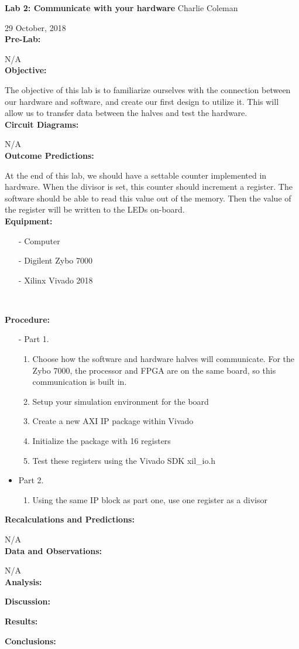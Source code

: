 \documentclass[12pt]{article}
\begin{document}
\noindent \textbf{Lab 2: Communicate with your hardware} \hfill Charlie Coleman

\noindent \hfill 29 October, 2018\\

\noindent \textbf{Pre-Lab:}

N/A\\

\noindent \textbf{Objective:}

The objective of this lab is to familiarize ourselves with the connection between our hardware and software, and create our first design to utilize it. This will allow us to transfer data between the halves and test the hardware.\\

\noindent \textbf{Circuit Diagrams:}

N/A\\

\noindent \textbf{Outcome Predictions:}

At the end of this lab, we should have a settable counter implemented in hardware. When the divisor is set, this counter should increment a register. The software should be able to read this value out of the memory. Then the value of the register will be written to the LEDs on-board.\\

\noindent \textbf{Equipment:}

\begin{itemize}[nolistsep, noitemsep]
	\item[-] Computer
	\item[-] Digilent Zybo 7000
	\item[-] Xilinx Vivado 2018
\end{itemize}~

\noindent \textbf{Procedure:}

\begin{itemize}
	\item[-] Part 1.
	\begin{enumerate}
		\item Choose how the software and hardware halves will communicate. For the Zybo 7000, the processor and FPGA are on the same board, so this communication is built in.
		\item Setup your simulation environment for the board
		\item Create a new AXI IP package within Vivado
		\item Initialize the package with 16 registers
		\item Test these registers using the Vivado SDK \8 xil\_io.h
	\end{enumerate}
	\item Part 2.
	\begin{enumerate}
		\item Using the same IP block as part one, use one register as a divisor
	\end{enumerate}
\end{itemize}

\noindent \textbf{Recalculations and Predictions:}

N/A\\

\noindent \textbf{Data and Observations:}

N/A\\

\noindent \textbf{Analysis:}

\noindent \textbf{Discussion:}

\noindent \textbf{Results:}

\noindent \textbf{Conclusions:}
\end{document}
